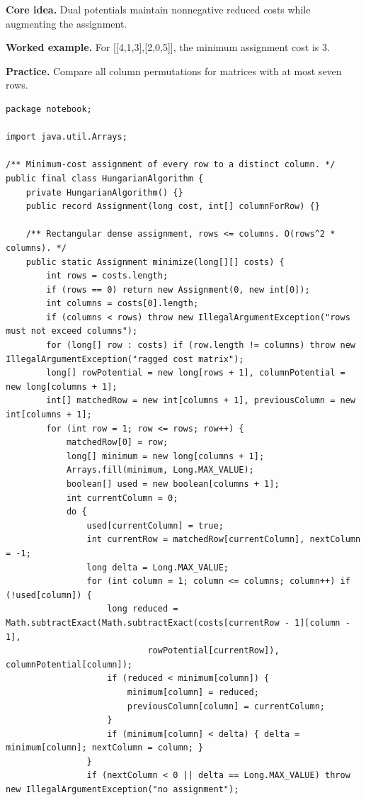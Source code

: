 \documentclass[10pt,letterpaper]{article}
\begin{document}
\noindent\textbf{Core idea.} Dual potentials maintain nonnegative reduced costs while augmenting the assignment.\par
\noindent\textbf{Worked example.} For [[4,1,3],[2,0,5]], the minimum assignment cost is 3.\par
\noindent\textbf{Practice.} Compare all column permutations for matrices with at most seven rows.\par
\begin{lstlisting}
package notebook;

import java.util.Arrays;

/** Minimum-cost assignment of every row to a distinct column. */
public final class HungarianAlgorithm {
    private HungarianAlgorithm() {}
    public record Assignment(long cost, int[] columnForRow) {}

    /** Rectangular dense assignment, rows <= columns. O(rows^2 * columns). */
    public static Assignment minimize(long[][] costs) {
        int rows = costs.length;
        if (rows == 0) return new Assignment(0, new int[0]);
        int columns = costs[0].length;
        if (columns < rows) throw new IllegalArgumentException("rows must not exceed columns");
        for (long[] row : costs) if (row.length != columns) throw new IllegalArgumentException("ragged cost matrix");
        long[] rowPotential = new long[rows + 1], columnPotential = new long[columns + 1];
        int[] matchedRow = new int[columns + 1], previousColumn = new int[columns + 1];
        for (int row = 1; row <= rows; row++) {
            matchedRow[0] = row;
            long[] minimum = new long[columns + 1];
            Arrays.fill(minimum, Long.MAX_VALUE);
            boolean[] used = new boolean[columns + 1];
            int currentColumn = 0;
            do {
                used[currentColumn] = true;
                int currentRow = matchedRow[currentColumn], nextColumn = -1;
                long delta = Long.MAX_VALUE;
                for (int column = 1; column <= columns; column++) if (!used[column]) {
                    long reduced = Math.subtractExact(Math.subtractExact(costs[currentRow - 1][column - 1],
                            rowPotential[currentRow]), columnPotential[column]);
                    if (reduced < minimum[column]) {
                        minimum[column] = reduced;
                        previousColumn[column] = currentColumn;
                    }
                    if (minimum[column] < delta) { delta = minimum[column]; nextColumn = column; }
                }
                if (nextColumn < 0 || delta == Long.MAX_VALUE) throw new IllegalArgumentException("no assignment");

\end{lstlisting}
\end{document}
